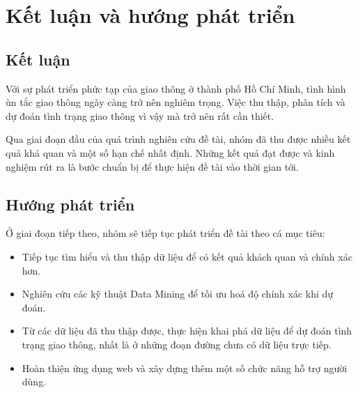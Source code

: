 
\chapter{Kết luận và hướng phát triển} %

\label{Chapter8}

\section{Kết luận}
Với sự phát triển phức tạp của giao thông ở thành phố Hồ Chí Minh, tình hình ùn tắc giao thông ngày càng trở nên nghiêm trọng. Việc thu thập, phân tích và dự đoán tình trạng giao thông vì vậy mà trở nên rất cần thiết.

Qua giai đoạn đầu của quá trình nghiên cứu đề tài, nhóm đã thu được nhiều kết quả khả quan và một số hạn chế nhất định. Những kết quả đạt được và kinh nghiệm rút ra là bước chuẩn bị để thực hiện đề tài vào thời gian tới.

\section{Hướng phát triển}
Ở giai đoạn tiếp theo, nhóm sẽ tiếp tục phát triển đề tài theo cá mục tiêu:
\begin{itemize}
    \item Tiếp tục tìm hiểu và thu thập dữ liệu để có kết quả khách quan và chính xác hơn.
    \item Nghiên cứu các kỹ thuật Data Mining để tối ưu hoá độ chính xác khi dự đoán.
    \item Từ các dữ liệu đã thu thập được, thực hiện khai phá dữ liệu để dự đoán tình trạng giao thông, nhất là ở những đoạn đường chưa có dữ liệu trực tiếp.
    \item Hoàn thiện ứng dụng web và xây dựng thêm một số chức năng hỗ trợ người dùng.
\end{itemize}